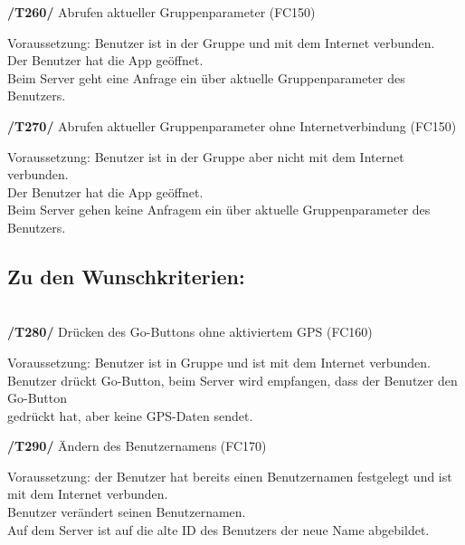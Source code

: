 \begin{itemize}
\begin{itemize}
\begin{itemize}
\begin{itemize}
\textbf{/T260/} Abrufen aktueller Gruppenparameter (FC150)\\
\begin{itemize}
Voraussetzung: Benutzer ist in der Gruppe und mit dem Internet verbunden.     \\
Der Benutzer hat die App geöffnet.                                             \\
Beim Server geht eine Anfrage ein über aktuelle Gruppenparameter des Benutzers. \\
\end{itemize}

\textbf{/T270/} Abrufen aktueller Gruppenparameter ohne Internetverbindung (FC150)\\
\begin{itemize}
Voraussetzung: Benutzer ist in der Gruppe aber nicht mit dem Internet verbunden. \\
Der Benutzer hat die App geöffnet.                                                \\
Beim Server gehen keine Anfragem ein über aktuelle Gruppenparameter des Benutzers. \\
\end{itemize}

\subsection{Zu den Wunschkriterien:}\\

\textbf{/T280/} Drücken des Go-Buttons ohne aktiviertem GPS (FC160)\\
\begin{itemize}
Voraussetzung: Benutzer ist in Gruppe und ist mit dem Internet verbunden.           \\
Benutzer drückt Go-Button, beim Server wird empfangen, dass der Benutzer den Go-Button\\
gedrückt hat, aber keine GPS-Daten sendet.                                             \\
\end{itemize}

\textbf{/T290/} Ändern des Benutzernamens (FC170)\\
\begin{itemize}
Voraussetzung: der Benutzer hat bereits einen Benutzernamen festgelegt und ist mit dem Internet verbunden.\\
Benutzer verändert seinen Benutzernamen.                                                                   \\
Auf dem Server ist auf die alte ID des Benutzers der neue Name abgebildet.                                  \\
\end{itemize}


\end{itemize}
\end{itemize}
\end{itemize}
\end{itemize}
